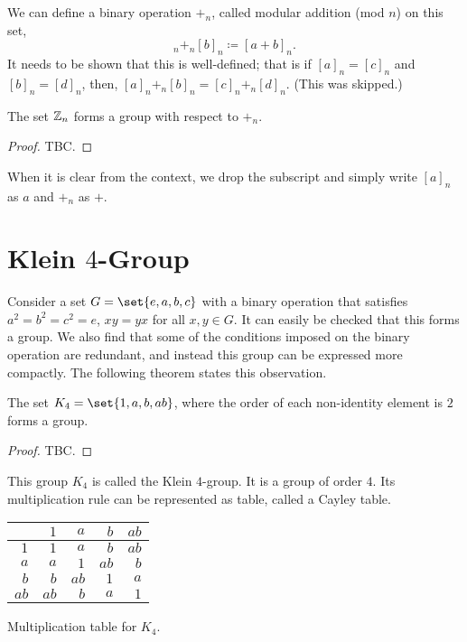 \documentclass[11pt]{penrose}
\begin{document}
We can define a binary operation $+_n$, called modular addition (mod $n$) on this set,
\begin{equation}
    [a]_n +_n [b]_n \coloneq [a + b]_n.
\end{equation}
It needs to be shown that this is well-defined; that is if $[a]_n = [c]_n$ and $[b]_n = [d]_n$, then, $[a]_n +_n [b]_n = [c]_n +_n [d]_n$. (This was skipped.)

\begin{nthm}
    The set $\mathbb{Z}_n$ forms a group with respect to $+_n$.
\end{nthm}
\begin{proof}
    TBC.
\end{proof}

When it is clear from the context, we drop the subscript and simply write $[a]_n$ as $a$ and $+_n$ as $+$.

\section{\texorpdfstring{Klein $4$-Group}{Klein 4 Group}}
Consider a set $G = \set{e, a, b, c}$ with a binary operation that satisfies $a^2 = b^2 = c^2 = e$, $xy = yx$ for all $x, y \in G$. It can easily be checked that this forms a group. We also find that some of the conditions imposed on the binary operation are redundant, and instead this group can be expressed more compactly. The following theorem states this observation.

\begin{nthm}
    The set $K_4 = \set{1, a, b, ab}$, where the order of each non-identity element is $2$ forms a group.
\end{nthm}
\begin{proof}
    TBC.
\end{proof}

This group $K_4$ is called the Klein $4$-group. It is a group of order $4$. Its multiplication rule can be represented as table, called a Cayley table.
\begin{center}
    \begin{tabularx}{0.3\textwidth}{|R|R|R|R|R|}
        \hline
             & $ 1$ & $ a$ & $ b$ & $ab$ \\ \hline
        $ 1$ & $ 1$ & $ a$ & $ b$ & $ab$ \\ \hline
        $ a$ & $ a$ & $ 1$ & $ab$ & $ b$ \\ \hline
        $ b$ & $ b$ & $ab$ & $ 1$ & $ a$ \\ \hline
        $ab$ & $ab$ & $ b$ & $ a$ & $ 1$ \\ \hline
    \end{tabularx}

    {Multiplication table for $K_4$.}
\end{center}
\end{document}
